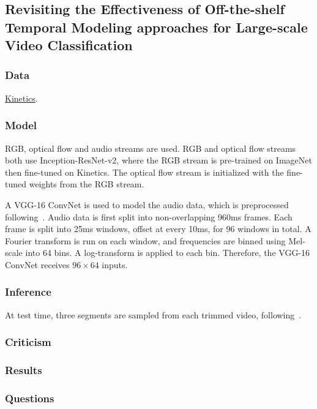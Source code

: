 \documentclass[a4paper, 12pt]{article}
\begin{document}
\subsection{Revisiting the Effectiveness of Off-the-shelf Temporal Modeling
            approaches for Large-scale Video
            Classification\citet{2017arXiv170803805B}}

\subsubsection{Data}

\hyperref[kinetics]{Kinetics}.

\subsubsection{Model}

RGB, optical flow and audio streams are used. RGB and optical flow streams both
use Inception-ResNet-v2, where the RGB stream is pre-trained on ImageNet then
fine-tuned on Kinetics. The optical flow stream is initialized with the
fine-tuned weights from the RGB stream.

A VGG-16 ConvNet is used to model the audio data, which is preprocessed
following~\citet{DBLP:journals/corr/HersheyCEGJMPPS16}. Audio data is first
split into non-overlapping 960ms frames. Each frame is split into 25ms windows,
offset at every 10ms, for 96 windows in total. A Fourier transform is run on
each window, and frequencies are binned using Mel-scale into 64 bins. A
log-transform is applied to each bin. Therefore, the VGG-16 ConvNet receives
$96 \times 64$ inputs.

\subsubsection{Inference}

At test time, three segments are sampled from each trimmed video,
following~\citet{DBLP:journals/corr/WangXW0LTG16}.

\subsubsection{Criticism}

\subsubsection{Results}

\subsubsection{Questions}
\end{document}
